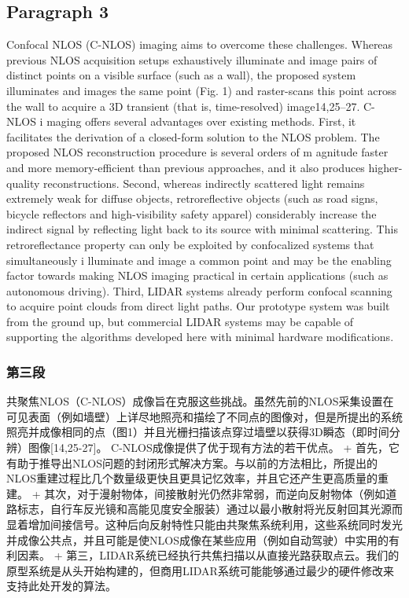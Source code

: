 \documentclass[11pt]{article}
\begin{document}
    \subsection{Paragraph 3}\label{paragraph-3}

Confocal NLOS (C-NLOS) imaging aims to overcome these challenges.
Whereas previous NLOS acquisition setups exhaustively illuminate and
image pairs of distinct points on a visible surface (such as a wall),
the proposed system illuminates and images the same point (Fig. 1) and
raster-scans this point across the wall to acquire a 3D transient (that
is, time-resolved) image14,25--27. C-NLOS i maging offers several
advantages over existing methods. First, it facilitates the derivation
of a closed-form solution to the NLOS problem. The proposed NLOS
reconstruction procedure is several orders of m agnitude faster and more
memory-efficient than previous approaches, and it also produces
higher-quality reconstructions. Second, whereas indirectly scattered
light remains extremely weak for diffuse objects, retroreflective
objects (such as road signs, bicycle reflectors and high-visibility
safety apparel) considerably increase the indirect signal by reflecting
light back to its source with minimal scattering. This retroreflectance
property can only be exploited by confocalized systems that
simultaneously i lluminate and image a common point and may be the
enabling factor towards making NLOS imaging practical in certain
applications (such as autonomous driving). Third, LIDAR systems already
perform confocal scanning to acquire point clouds from direct light
paths. Our prototype system was built from the ground up, but commercial
LIDAR systems may be capable of supporting the algorithms developed here
with minimal hardware modifications.

    \subsubsection{第三段}\label{ux7b2cux4e09ux6bb5}

共聚焦NLOS（C-NLOS）成像旨在克服这些挑战。虽然先前的NLOS采集设置在可见表面（例如墙壁）上详尽地照亮和描绘了不同点的图像对，但是所提出的系统照亮并成像相同的点（图1）并且光栅扫描该点穿过墙壁以获得3D瞬态（即时间分辨）图像{[}14,25-27{]}。
C-NLOS成像提供了优于现有方法的若干优点。 +
首先，它有助于推导出NLOS问题的封闭形式解决方案。与以前的方法相比，所提出的NLOS重建过程比几个数量级更快且更具记忆效率，并且它还产生更高质量的重建。
+
其次，对于漫射物体，间接散射光仍然非常弱，而逆向反射物体（例如道路标志，自行车反光镜和高能见度安全服装）通过以最小散射将光反射回其光源而显着增加间接信号。这种后向反射特性只能由共聚焦系统利用，这些系统同时发光并成像公共点，并且可能是使NLOS成像在某些应用（例如自动驾驶）中实用的有利因素。
+
第三，LIDAR系统已经执行共焦扫描以从直接光路获取点云。我们的原型系统是从头开始构建的，但商用LIDAR系统可能能够通过最少的硬件修改来支持此处开发的算法。
\end{document}
